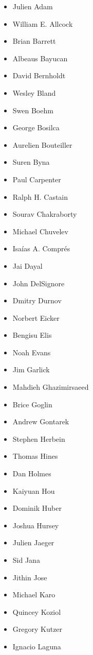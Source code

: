 \begin{itemize}
    \item Julien Adam %
    \item William E. Allcock
    \item Brian Barrett
    \item Albeaus Bayucan
    \item David Bernholdt
    \item Wesley Bland
    \item Swen Boehm
    \item George Bosilca
    \item Aurelien Bouteiller
    \item Suren Byna
    \item Paul Carpenter
    \item Ralph H. Castain
    \item Sourav Chakraborty
    \item Michael Chuvelev
    \item Isaías A. Comprés
    \item Jai Dayal
    \item John DelSignore
    \item Dmitry Durnov
    \item Norbert Eicker
    \item Bengisu Elis
    \item Noah Evans
    \item Jim Garlick
    \item Mahdieh Ghazimirsaeed
    \item Brice Goglin
    \item Andrew Gontarek
    \item Stephen Herbein
    \item Thomas Hines
    \item Dan Holmes
    \item Kaiyuan Hou
    \item Dominik Huber
    \item Joshua Hursey
    \item Julien Jaeger
    \item Sid Jana
    \item Jithin Jose
    \item Michael Karo
    \item Quincey Koziol
    \item Gregory Kutzer
    \item Ignacio Laguna

\end{itemize}
